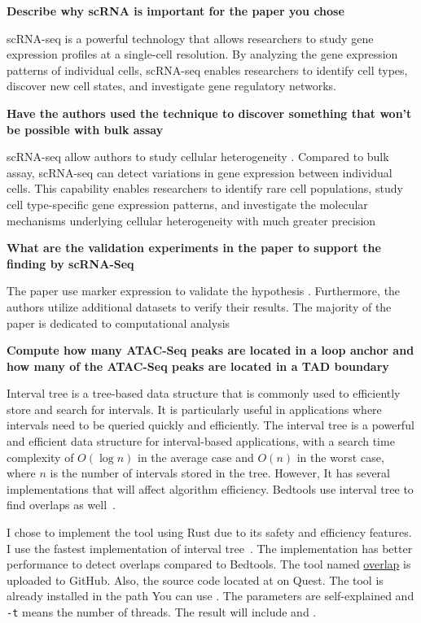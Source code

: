 \documentclass{article}
\begin{document}
\textbf{Describe why scRNA is important for the paper you chose}

scRNA-seq is a powerful technology that allows researchers to study gene expression profiles at a single-cell resolution.
By analyzing the gene expression patterns of individual cells, scRNA-seq enables researchers to identify cell types, discover new cell states, and investigate gene regulatory networks.


\textbf{Have the authors used the technique to discover something that won’t be possible with bulk assay}

scRNA-seq allow authors to study cellular heterogeneity \citep{Lin2022}.
Compared to bulk assay, scRNA-seq can detect variations in gene expression between individual cells.
This capability enables researchers to identify rare cell populations, study cell type-specific gene expression patterns, and investigate the molecular mechanisms underlying cellular heterogeneity with much greater precision


\textbf{What are the validation experiments in the paper to support the finding by scRNA-Seq}


The paper use marker expression to validate the hypothesis \citep{Lin2022}.
Furthermore, the authors utilize additional datasets to verify their results.
The majority of the paper is dedicated to computational analysis


\textbf{Compute how many ATAC-Seq peaks are located in a loop anchor and how many of the ATAC-Seq peaks are located in a TAD boundary}


Interval tree is a tree-based data structure that is commonly used to efficiently store and search for intervals.
It is particularly useful in applications where intervals need to be queried quickly and efficiently.
The interval tree is a powerful and efficient data structure for interval-based applications,
with a search time complexity of \(O(\log{n})\) in the average case and \(O(n)\) in the worst case, where \(n\) is the number of intervals stored in the tree.
However, It has several implementations that will affect algorithm efficiency.
Bedtools use interval tree to find overlaps as well~\citep{Quinlan2010}.

I chose to implement the tool using Rust due to its safety and efficiency features.
I use the fastest implementation of interval tree~\citep{dcjones2023Feb}.
The implementation has better performance to detect overlaps compared to Bedtools.
The tool named \href{https://github.com/cauliyang/2023_DGP_486/tree/master/src/overlap}{overlap} is uploaded to GitHub.
Also, the source code located at  on Quest.
The tool is already installed in the path 
You can use .
The parameters are self-explained and \texttt{-t} means the number of threads.
The result will include  and .
\end{document}
